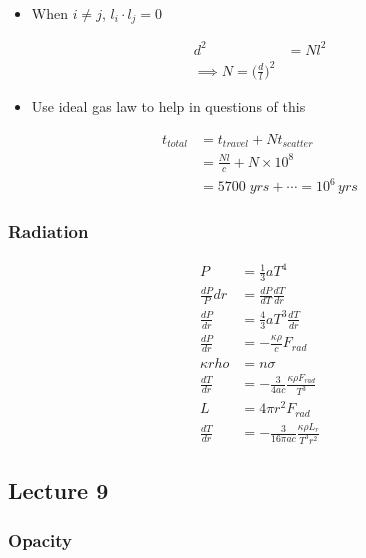 \documentclass[a4paper,11pt,normalem]{article}
\begin{document}
\begin{itemize}
\item
  When \(i \neq j\), \(l_i \cdot l_j = 0\)
\end{itemize}

\[
    \begin{aligned}
    d^2 &= Nl^2 \\
    \implies N = \bigg(\frac{d}{l}\bigg)^2
    \end{aligned}
\]

\begin{itemize}
\item
  Use ideal gas law to help in questions of this
\end{itemize}

\[
    \begin{aligned}
    t_{total} &= t_{travel} + Nt_{scatter} \\
    &= \frac{Nl}{c} + N\times 10^8 \\
    &= 5700\;yrs + \cdots = 10^6 \, yrs
    \end{aligned}
\]

\subsubsection{Radiation}\label{radiation}

\[
    \begin{aligned}
    P &= \frac{1}{3}a T^4 \\
    \frac{dP}P{dr} &= \frac{dP}{dT}\frac{dT}{dr} \\
    \frac{dP}{dr} &= \frac{4}{3}a T^3 \frac{dT}{dr} \\
    \frac{dP}{dr} &= -\frac{\kappa\rho}{c}F_{rad} \\
    \kappa rho &= n\sigma \\
    \frac{dT}{dr} &= -\frac{3}{4ac}\frac{\kappa\rho F_{rad}}{T^3} \\
    L &= 4\pi r^2 F_{rad} \\
    \frac{dT}{dr} &= -\frac{3}{16\pi ac}\frac{\kappa\rho L_r}{T^3 r^2}
    \end{aligned}
\]

\subsection{Lecture 9}\label{lecture-9}

\subsubsection{Opacity}\label{opacity}
\end{document}
